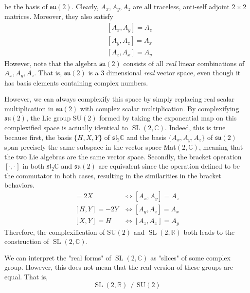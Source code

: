 \documentclass{article}
\DeclareMathOperator{\SL}{SL}
\begin{document}
    be the basis of $\mathfrak{su}(2)$. Clearly, $A_x, A_y, A_z$ are all traceless, anti-self adjoint $2 \times 2$ matrices. Moreover, they also satisfy
    \begin{align*}
        & [A_x, A_y] = A_z \\
        & [A_y, A_z] = A_x \\
        & [A_z, A_x] = A_y
    \end{align*}
    However, note that the algebra $\mathfrak{su}(2)$ consists of all \textit{real} linear combinations of $A_x, A_y, A_z$. That is, $\mathfrak{su}(2)$ is a 3 dimensional \textit{real} vector space, even though it has basis elements containing complex numbers. 

    However, we can always complexify this space by simply replacing real scalar multiplication in $\mathfrak{su}(2)$ with complex scalar multiplication. By complexifying $\mathfrak{su}(2)$, the Lie group SU$(2)$ formed by taking the exponential map on this complexified space is actually identical to $\SL(2, \mathbb{C})$. Indeed, this is true because first, the basis $\{H, X, Y\}$ of $\mathfrak{sl}_2 \mathbb{C}$ and the basis $\{A_x, A_y, A_z\}$ of $\mathfrak{su}(2)$ span precisely the same subspace in the vector space Mat$(2, \mathbb{C})$, meaning that the two Lie algebras are the same vector space. Secondly, the bracket operation $[\cdot, \cdot]$ in both $\mathfrak{sl}_2 \mathbb{C}$ and $\mathfrak{su}(2)$ are equivalent since the operation defined to be the commutator in both cases, resulting in the similarities in the bracket behaviors. 
    \begin{align*}
        [H,X] = 2X & \iff [A_x, A_y] = A_z \\
        [H,Y] = - 2Y & \iff [A_y, A_z] = A_x\\
        [X,Y] = H & \iff  [A_z, A_x] = A_y 
    \end{align*}
    Therefore, the complexification of SU$(2)$ and $\SL(2, \mathbb{R})$ both leads to the construction of $\SL(2, \mathbb{C})$. 
    \begin{center}
    \end{center}
    We can interpret the "real forms" of $\SL(2, \mathbb{C})$ as "slices" of some complex group. However, this does not mean that the real version of these groups are equal. That is, 
    \[\SL(2, \mathbb{R}) \neq \text{SU}(2)\]
\end{document}
